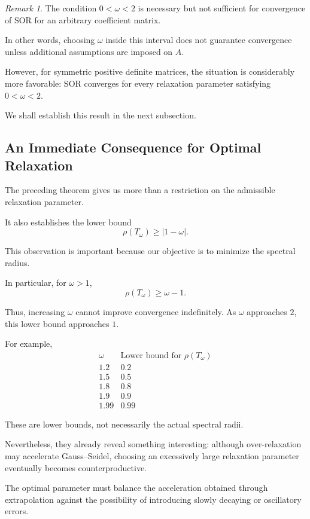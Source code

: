 \documentclass[11pt,a4paper]{article}
\theoremstyle{definition}
\theoremstyle{remark}
\newtheorem{remark}[theorem]{Remark}
\begin{document}
\begin{remark}
The condition $0<\omega<2$ is necessary but
not sufficient for convergence of SOR for an
arbitrary coefficient matrix.

In other words, choosing $\omega$ inside this
interval does not guarantee convergence unless
additional assumptions are imposed on $A$.

However, for symmetric positive definite matrices,
the situation is considerably more favorable:
SOR converges for every relaxation parameter
satisfying $0<\omega<2$.

We shall establish this result in the next subsection.
\end{remark}


\subsection{An Immediate Consequence for Optimal Relaxation}

The preceding theorem gives us more than a restriction
on the admissible relaxation parameter.

It also establishes the lower bound
\[
    \boxed{
    \rho(T_\omega)\geq|1-\omega|.
    }
\]

This observation is important because our objective
is to minimize the spectral radius.

In particular, for $\omega>1$,
\[
    \rho(T_\omega)\geq\omega-1.
\]

Thus, increasing $\omega$ cannot improve convergence
indefinitely. As $\omega$ approaches $2$, this lower
bound approaches $1$.

For example,
\[
\begin{array}{c|c}
\omega & \text{Lower bound for }\rho(T_\omega)\\
\hline
1.2 & 0.2\\
1.5 & 0.5\\
1.8 & 0.8\\
1.9 & 0.9\\
1.99 & 0.99
\end{array}
\]

These are lower bounds, not necessarily the actual
spectral radii.

Nevertheless, they already reveal something
interesting: although over-relaxation may accelerate
Gauss--Seidel, choosing an excessively large
relaxation parameter eventually becomes
counterproductive.

The optimal parameter must balance the acceleration
obtained through extrapolation against the possibility
of introducing slowly decaying or oscillatory errors.
\end{document}
